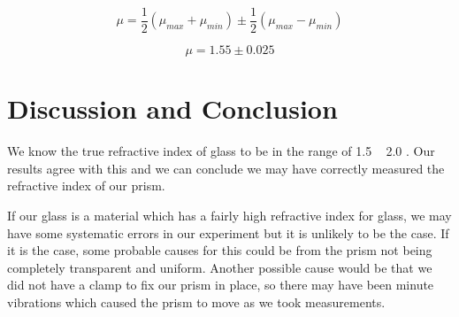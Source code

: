 \documentclass{article}
\begin{document}
\begin{equation}\label{eq:half_range}
  \mu = \frac{1}{2}(\mu_{max} + \mu_{min}) \pm \frac{1}{2}(\mu_{max} - \mu_{min})
\end{equation}

$$ \mu = 1.55 \pm 0.025 $$

\section{Discussion and Conclusion}

We know the true refractive index of glass to be in the range of 1.5 ~ 2.0 \autocite{mohr_2016}. Our results agree with this and we can conclude we may have correctly measured the refractive index of our prism.

If our glass is a material which has a fairly high refractive index for glass, we may have some systematic errors in our experiment but it is unlikely to be the case. If it is the case, some probable causes for this could be from the prism not being completely transparent and uniform. Another possible cause would be that we did not have a clamp to fix our prism in place, so there may have been minute vibrations which caused the prism to move as we took measurements.

\printbibliography
\end{document}
